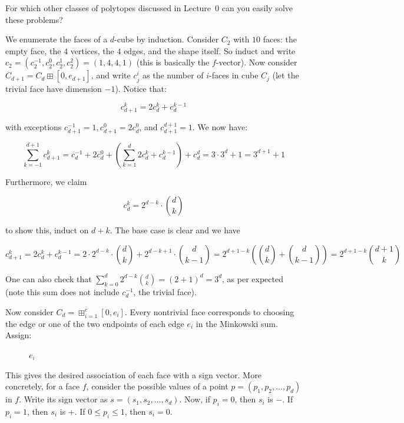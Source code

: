 \documentclass{article}
\begin{document}
\begin{enumerate}
For which other classes of polytopes discussed in Lecture~0 can you easily solve these problems?

\begin{solution}
    We enumerate the faces of a $d$-cube by induction. Consider $C_2$ with $10$ faces: the empty face, the $4$ vertices, the $4$ edges, and the shape itself. So induct and write $c_2 = (c_2^{-1}, c_2^0, c_2^1, c_2^2) = (1,4,4,1)$ (this is basically the $f$-vector). Now consider $C_{d+1} = C_d \boxplus [0,e_{d+1}]$, and write $c_j^i$ as the number of $i$-faces in cube $C_j$ (let the trivial face have dimension $-1$). Notice that:
    
    \[c_{d+1}^k = 2c_d^k + c_d^{k-1}\]
    
    with exceptions $c_{d+1}^{-1} = 1, c_{d+1}^0 = 2c_d^0$, and $c_{d+1}^{d+1} = 1$. We now have:

    \[\sum_{k=-1}^{d+1} c_{d+1}^k = c_d^{-1} + 2c_d^0 + \left(\sum_{k=1}^d 2c_d^k + c_d^{k-1} \right) + c_d^d  = 3\cdot3^d + 1 = 3^{d+1} + 1\]

    Furthermore, we claim 

    \[c_d^k = 2^{d-k} \cdot \binom{d}{k}\]

    to show this, induct on $d+k$. The base case is clear and we have

    \[c_{d+1}^k = 2c_d^k + c_d^{k-1} = 2\cdot2^{d-k} \cdot \binom{d}{k} + 2^{d-k+1}\cdot \binom{d}{k-1} = 2^{d+1-k} \left( \binom{d}{k} + \binom{d}{k-1} \right) = 2^{d+1-k}\binom{d+1}{k}\]

    One can also check that $\sum_{k=0}^d 2^{d-k}\binom{d}{k} = (2+1)^d = 3^d$, as per expected (note this sum does not include $c_d^{-1}$, the trivial face).

    Now consider $C_d = \boxplus_{i=1}^c [0,e_i]$. Every nontrivial face corresponds to choosing the edge or one of the two endpoints of each edge $e_i$ in the Minkowski sum. Assign:
\begin{figure}[H]
    \centering
\caption{$e_i$}
\end{figure}

This gives the desired association of each face with a sign vector. More concretely, for a face $f$, consider the possible values of a point $p = (p_1, p_2, \ldots, p_d)$ in $f$. Write its sign vector as $s = (s_1, s_2, \ldots, s_d)$. Now, if $p_i = 0$, then $s_i$ is $-$. If $p_i = 1$, then $s_i$ is $+$. If $0 \leq p_i \leq 1$, then $s_i = 0$. 


\end{solution}
\end{enumerate}
\end{document}

